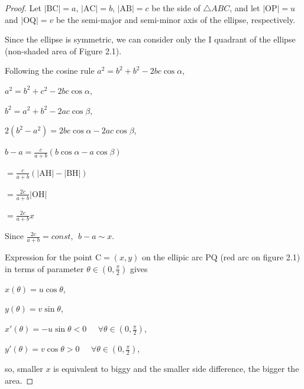 \documentclass[a4paper]{book}
\numberwithin{theorem}{section}%
\begin{document}
\begin{proof} 
    Let $|\mathrm{BC}|=a$, $|\mathrm{AC}|=b$, $|\mathrm{AB}|=c$ be the side of $\triangle ABC$, and let $|\mathrm{OP}|=u$ and $|\mathrm{OQ}|=v$ be the semi-major and semi-minor axis of the ellipse, respectively.

    Since the ellipse is symmetric, we can consider only the I quadrant of the ellipse (non-shaded area of Figure 2.1).

    Following the cosine rule $a^{2}=b^{2}+b^{2}-2bc\cos{\alpha}$,
    \begin{center}
        $\displaystyle a^{2}=b^{2}+c^{2}-2bc\cos{\alpha}$,

        $\displaystyle b^{2}=a^{2}+b^{2}-2ac\cos{\beta}$,

        $\displaystyle 2(b^{2}-a^{2})=2bc\cos{\alpha}-2ac\cos{\beta}$,

        $\displaystyle b-a=\frac{c}{a+b}(b\cos{\alpha}-a\cos{\beta})$

        $\displaystyle =\frac{c}{a+b}(|\mathrm{AH}|-|\mathrm{BH}|)$

        $\displaystyle =\frac{2c}{a+b}|\mathrm{OH}|$

        $\displaystyle =\frac{2c}{a+b}x$

        Since $\displaystyle \frac{2c}{a+b}=const$, $\displaystyle \;b-a\sim x$.
    \end{center}
    Expression for the point $\mathrm{C}=(x,y)$ on the ellipic arc $\mathrm{PQ}$ (red arc on figure 2.1) in terms of parameter $\theta\in(0,\frac{\pi}{2})$ gives
    \begin{center}
        $x(\theta)=u\cos{\theta}$,

        $y(\theta)=v\sin{\theta}$,

        $x'(\theta)=-u\sin{\theta}<0\;\;\;\;\;\forall\theta\in(0,\frac{\pi}{2})$,

        $y'(\theta)=v\cos{\theta}>0\;\;\;\;\;\forall\theta\in(0,\frac{\pi}{2})$,
    \end{center}
    so, smaller $x$ is equivalent to biggy and the smaller side difference, the bigger the area.
\end{proof}
\end{document}
